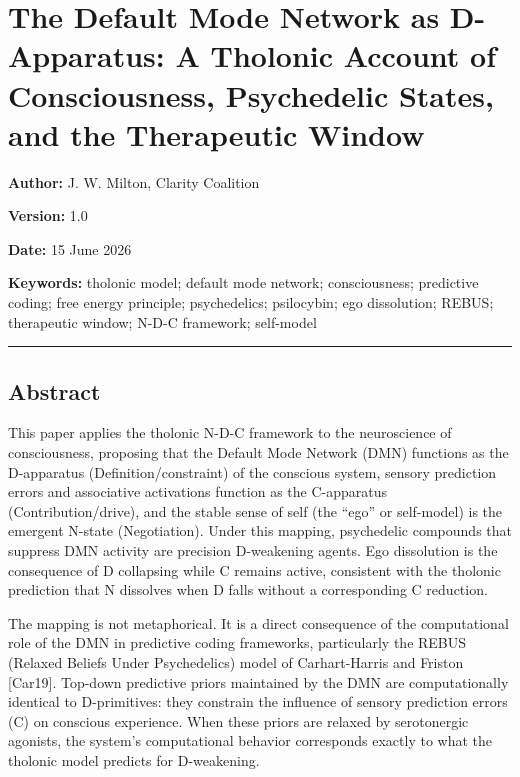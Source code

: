 \documentclass[
  11pt,
  letterpaper,
]{article}
\author{}
\date{}
\begin{document}
\section{The Default Mode Network as D-Apparatus: A Tholonic Account of
Consciousness, Psychedelic States, and the Therapeutic
Window}\label{the-default-mode-network-as-d-apparatus-a-tholonic-account-of-consciousness-psychedelic-states-and-the-therapeutic-window}

\textbf{Author:} J. W. Milton, Clarity Coalition

\textbf{Version:} 1.0

\textbf{Date:} 15 June 2026

\textbf{Keywords:} tholonic model; default mode network; consciousness;
predictive coding; free energy principle; psychedelics; psilocybin; ego
dissolution; REBUS; therapeutic window; N-D-C framework; self-model

\begin{center}\rule{0.5\linewidth}{0.5pt}\end{center}

\subsection{Abstract}\label{abstract}

This paper applies the tholonic N-D-C framework to the neuroscience of
consciousness, proposing that the Default Mode Network (DMN) functions
as the D-apparatus (Definition/constraint) of the conscious system,
sensory prediction errors and associative activations function as the
C-apparatus (Contribution/drive), and the stable sense of self (the
``ego'' or self-model) is the emergent N-state (Negotiation). Under this
mapping, psychedelic compounds that suppress DMN activity are precision
D-weakening agents. Ego dissolution is the consequence of D collapsing
while C remains active, consistent with the tholonic prediction that N
dissolves when D falls without a corresponding C reduction.

The mapping is not metaphorical. It is a direct consequence of the
computational role of the DMN in predictive coding frameworks,
particularly the REBUS (Relaxed Beliefs Under Psychedelics) model of
Carhart-Harris and Friston {[}Car19{]}. Top-down predictive priors
maintained by the DMN are computationally identical to D-primitives:
they constrain the influence of sensory prediction errors (C) on
conscious experience. When these priors are relaxed by serotonergic
agonists, the system's computational behavior corresponds exactly to
what the tholonic model predicts for D-weakening.
\end{document}
